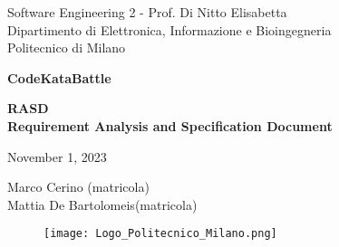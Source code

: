 \documentclass{article}
\begin{document}
\begin{titlepage}
  \centering
  {\normalsize
    Software Engineering 2 - Prof. Di Nitto Elisabetta \\
    Dipartimento di Elettronica, Informazione e Bioingegneria \\
    Politecnico di Milano \par
  }     \vspace{3cm}
  {\Huge \textbf{CodeKataBattle\\} } \vspace{1cm}
  {\large \textbf{RASD\\Requirement Analysis and Specification Document} \par} \vspace{1cm}
  {\normalsize November 1, 2023 \par} \vspace{4cm}
  {\normalsize Marco Cerino (matricola) \\ Mattia De Bartolomeis(matricola) \par} \vspace{4cm}
  \begin{figure}[h]
    \centering
    \texttt{[image: Logo\_Politecnico\_Milano.png]}
  \end{figure} \vspace{0.5cm}
\end{titlepage}

\tableofcontents







\end{document}
